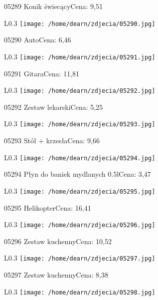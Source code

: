 05289 Konik świecącyCena: 9,51\newline
\begin{wrapfigure}{L}{0.3\textwidth}
\texttt{[image: /home/dearn/zdjecia/05290.jpg]}
\end{wrapfigure}
05290 AutoCena: 6,46\newline
\begin{wrapfigure}{L}{0.3\textwidth}
\texttt{[image: /home/dearn/zdjecia/05291.jpg]}
\end{wrapfigure}
05291 GitaraCena: 11,81\newline
\begin{wrapfigure}{L}{0.3\textwidth}
\texttt{[image: /home/dearn/zdjecia/05292.jpg]}
\end{wrapfigure}
05292 Zestaw lekarskiCena: 5,25\newline
\begin{wrapfigure}{L}{0.3\textwidth}
\texttt{[image: /home/dearn/zdjecia/05293.jpg]}
\end{wrapfigure}
05293 Stół + krzesłaCena: 9,66\newline
\begin{wrapfigure}{L}{0.3\textwidth}
\texttt{[image: /home/dearn/zdjecia/05294.jpg]}
\end{wrapfigure}
05294 Płyn do baniek mydlanych 0.5lCena: 3,47\newline
\begin{wrapfigure}{L}{0.3\textwidth}
\texttt{[image: /home/dearn/zdjecia/05295.jpg]}
\end{wrapfigure}
05295 HelikopterCena: 16,41\newline
\begin{wrapfigure}{L}{0.3\textwidth}
\texttt{[image: /home/dearn/zdjecia/05296.jpg]}
\end{wrapfigure}
05296 Zestaw kuchennyCena: 10,52\newline
\begin{wrapfigure}{L}{0.3\textwidth}
\texttt{[image: /home/dearn/zdjecia/05297.jpg]}
\end{wrapfigure}
05297 Zestaw kuchennyCena: 8,38\newline
\begin{wrapfigure}{L}{0.3\textwidth}
\texttt{[image: /home/dearn/zdjecia/05298.jpg]}
\end{wrapfigure}
